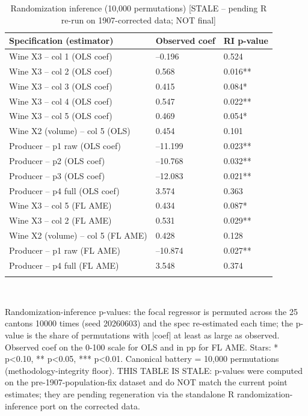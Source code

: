 \begin{table}[tbp] \centering
{}

\caption{Randomization inference (10,000 permutations) [STALE -- pending R re-run on 1907-corrected data; NOT final]}
\label{tab:T_ri}
\begin{tabularx}{\linewidth}{@{}lCC@{}}

\toprule
{Specification (estimator)}&{Observed coef}&{RI p-value} \tabularnewline
\midrule \addlinespace[\belowrulesep]
Wine X3 -- col 1 (OLS coef)&--0.196&0.524 \tabularnewline
Wine X3 -- col 2 (OLS coef)&0.568&0.016** \tabularnewline
Wine X3 -- col 3 (OLS coef)&0.415&0.084* \tabularnewline
Wine X3 -- col 4 (OLS coef)&0.547&0.022** \tabularnewline
Wine X3 -- col 5 (OLS coef)&0.469&0.054* \tabularnewline
Wine X2 (volume) -- col 5 (OLS)&0.454&0.101 \tabularnewline
Producer -- p1 raw (OLS coef)&--11.199&0.023** \tabularnewline
Producer -- p2 (OLS coef)&--10.768&0.032** \tabularnewline
Producer -- p3 (OLS coef)&--12.083&0.021** \tabularnewline
Producer -- p4 full (OLS coef)&3.574&0.363 \tabularnewline
Wine X3 -- col 5 (FL AME)&0.434&0.087* \tabularnewline
Wine X3 -- col 2 (FL AME)&0.531&0.029** \tabularnewline
Wine X2 (volume) -- col 5 (FL AME)&0.428&0.128 \tabularnewline
Producer -- p1 raw (FL AME)&--10.874&0.027** \tabularnewline
Producer -- p4 full (FL AME)&3.548&0.374 \tabularnewline
\bottomrule \addlinespace[\belowrulesep]

\end{tabularx}
\\ \parbox{\linewidth}{\footnotesize Randomization-inference p-values: the focal regressor is permuted across the 25 cantons 10000 times (seed 20260603) and the spec re-estimated each time; the p-value is the share of permutations with |coef| at least as large as observed. Observed coef on the 0-100 scale for OLS and in pp for FL AME. Stars: * p<0.10, ** p<0.05, *** p<0.01. Canonical battery = 10,000 permutations (methodology-integrity floor). THIS TABLE IS STALE: p-values were computed on the pre-1907-population-fix dataset and do NOT match the current point estimates; they are pending regeneration via the standalone R randomization-inference port on the corrected data.}
\end{table}
